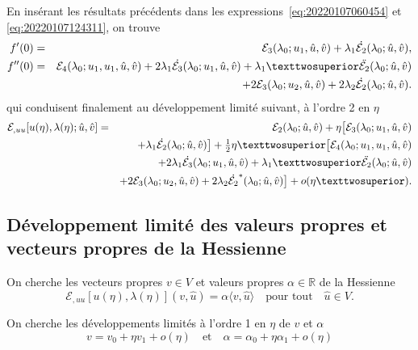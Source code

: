 \documentclass[12pt, final]{amsart}
\begin{document}
En insérant les résultats précédents dans les
expressions~\eqref{eq:20220107060454} et \eqref{eq:20220107124311}, on trouve
\begin{eqnarray}
  f'(0)&=&\mathcal E_3(\lambda _0; u_1, \hat{u}, \hat{v})
            +\lambda _1\dot{\mathcal E_2}(\lambda _0; \hat{u}, \hat{v}),\\
  \notag
  f''(0)&=&\mathcal E_4(\lambda _0; u_1, u_1, \hat{u}, \hat{v})
             +2\lambda _1\dot{\mathcal E_3}(\lambda _0; u_1, \hat{u}, \hat{v})
             +\lambda _1²\ddot{\mathcal E_2}(\lambda _0; \hat{u}, \hat{v})\\
          &&+2\mathcal E_3(\lambda _0; u_2, \hat{u}, \hat{v})
            +2\lambda _2\dot{\mathcal E_2}(\lambda _0; \hat{u}, \hat{v}).
\end{eqnarray}
qui conduisent finalement au développement limité suivant, à l'ordre 2 en \(\eta \)
\begin{eqnarray}
  \notag
  \mathcal E_{,uu}[u(\eta ), \lambda (\eta ); \hat{u}, \hat{v}]
  &=&\mathcal E_2(\lambda _0; \hat{u}, \hat{v})+\eta \bigl[\mathcal E_3(\lambda _0; u_1, \hat{u}, \hat{v})\\
  \notag
  &&+\lambda _1\dot{\mathcal E_2}(\lambda _0; \hat{u}, \hat{v})\bigr]+\tfrac12\eta ²\bigl[\mathcal E_4(\lambda _0; u_1, u_1, \hat{u}, \hat{v})\\
  \notag
  &&+2\lambda _1\dot{\mathcal E_3}(\lambda _0; u_1, \hat{u}, \hat{v})+\lambda _1²\ddot{\mathcal E_2}(\lambda _0; \hat{u}, \hat{v})\\
  &&+2\mathcal E_3(\lambda _0; u_2, \hat{u}, \hat{v})+2\lambda _2\dot{\mathcal E_2}^*(\lambda _0; \hat{u}, \hat{v})\bigr]+o(\eta ²).
\end{eqnarray}

\subsection{Développement limité des valeurs propres et vecteurs propres de la Hessienne}

On cherche les vecteurs propres \(v\in V\) et valeurs propres \(\alpha\in\mathbb R \) de la
Hessienne
\begin{equation}
  \label{eq:20211115082122}
  \mathcal E_{,uu}[u(\eta ), \lambda (\eta )](v, \hat{u})=\alpha\langle v, \hat{u}\rangle \quad\text{pour tout}\quad\hat{u}\in V.
\end{equation}

On cherche les développements limités à l'ordre 1 en \(\eta \) de \(v\) et \(\alpha\)
\begin{equation}
  \label{eq:20211115082037}
  v = v_0+\eta  v_1+o(\eta )\quad\text{et}\quad\alpha=\alpha_0+\eta \alpha_1+o(\eta )
\end{equation}
\end{document}
